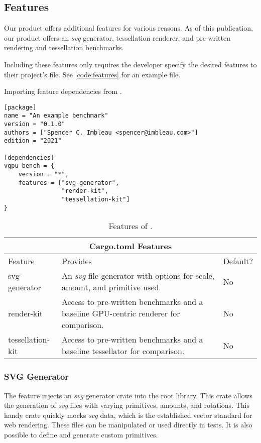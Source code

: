\subsection{Features}
Our product \toolname offers additional features for various reasons. As of this publication, our product offers an \textit{svg} generator, tessellation renderer, and pre-written rendering and tessellation benchmarks.\medskip

Including these features only requires the developer specify the desired features to their project's  file. See \cref{code:features} for an example  file.

\begin{snippet}
\caption{Importing feature dependencies from \toolname.}\label{code:features}
\begin{verbatim}
[package]
name = "An example benchmark"
version = "0.1.0"
authors = ["Spencer C. Imbleau <spencer@imbleau.com>"]
edition = "2021"

[dependencies]
vgpu_bench = {
    version = "*", 
    features = ["svg-generator", 
                "render-kit", 
                "tessellation-kit"]
}
\end{verbatim}
\end{snippet}

\begin{table}[H]
\centering
\begin{tabular}{ |p{.2\mywidth}||p{.6\mywidth}|p{.1\mywidth}| }
\hline
\multicolumn{3}{|c|}{Cargo.toml Features}\\
\hline
Feature&Provides&Default?\\
\hline
svg-generator&An \textit{svg} file generator with options for scale, amount, and primitive used.&No\\
\hline
render-kit&Access to pre-written benchmarks and a baseline GPU-centric renderer for comparison.&No\\
\hline
tessellation-kit&Access to pre-written benchmarks and a baseline tessellator for comparison.&No\\
\hline
\end{tabular}
\caption{\label{tab:features}Features of \toolname.}
\end{table}

\subsubsection{SVG Generator}\label{sec:svg-generator}
The  feature injects an \textit{svg} generator crate into the root library. This crate allows the generation of \textit{svg} files with varying primitives, amounts, and rotations. This handy crate quickly mocks \textit{svg} data, which is the established vector standard for web rendering. These files can be manipulated or used directly in tests. It is also possible to define and generate custom primitives.

